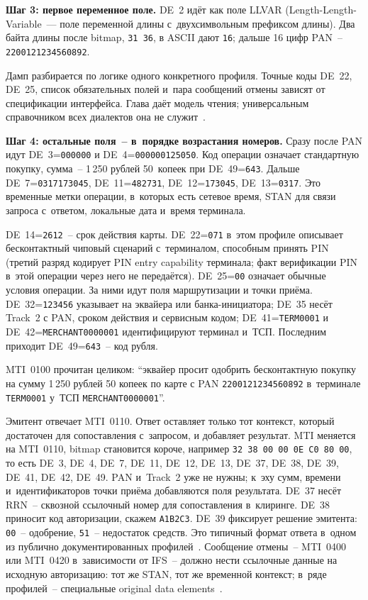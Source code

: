 \textbf{Шаг 3: первое переменное поле.} DE~2 идёт как поле LLVAR (Length-Length-Variable~--- поле переменной длины с~двухсимвольным префиксом длины). Два байта длины после bitmap, \texttt{31 36}, в ASCII дают \texttt{16}; дальше 16 цифр PAN~-- \texttt{2200121234560892}.

Дамп разбирается по логике одного конкретного профиля. Точные коды DE~22, DE~25, список обязательных полей и~пара сообщений отмены зависят от спецификации интерфейса. Глава даёт модель чтения; универсальным справочником всех диалектов она не служит~\cite{fis-iso8583-guide-2023}.

\textbf{Шаг 4: остальные поля~-- в~порядке возрастания номеров.}
Сразу после PAN идут DE~3=\texttt{000000} и DE~4=\texttt{000000125050}. Код операции означает стандартную покупку, сумма~-- 1\,250 рублей 50~копеек при DE~49=\texttt{643}.
Дальше DE~7=\texttt{0317173045}, DE~11=\texttt{482731}, DE~12=\texttt{173045}, DE~13=\texttt{0317}. Это временные метки операции, в~которых есть сетевое время, STAN для связи запроса с~ответом, локальные дата и~время терминала.

DE~14=\texttt{2612}~-- срок действия карты. DE~22=\texttt{071} в~этом профиле описывает бесконтактный чиповый сценарий с~терминалом, способным принять PIN (третий разряд кодирует PIN entry capability терминала; факт верификации PIN в~этой операции через него не передаётся). DE~25=\texttt{00} означает обычные условия операции.
За ними идут поля маршрутизации и точки приёма. DE~32=\texttt{123456} указывает на эквайера или банка-инициатора; DE~35 несёт Track~2 с PAN, сроком действия и сервисным кодом; DE~41=\texttt{TERM0001} и DE~42=\texttt{MERCHANT0000001} идентифицируют терминал и~ТСП. Последним приходит DE~49=\texttt{643}~-- код рубля.

MTI~0100 прочитан целиком: \enquote{эквайер просит одобрить бесконтактную покупку на сумму 1\,250 рублей 50 копеек по карте с PAN \texttt{2200121234560892} в~терминале \texttt{TERM0001} у~ТСП \texttt{MERCHANT0000001}}.

Эмитент отвечает MTI~0110. Ответ оставляет только тот контекст, который достаточен для сопоставления с~запросом, и добавляет результат.
MTI меняется на MTI~0110, bitmap становится короче, например \texttt{32 38 00 00 0E C0 80 00}, то есть DE~3, DE~4, DE~7, DE~11, DE~12, DE~13, DE~37, DE~38, DE~39, DE~41, DE~42, DE~49. PAN и~Track~2 уже не нужны; к~эху сумм, времени и~идентификаторов точки приёма добавляются поля результата.
DE~37 несёт RRN~-- сквозной ссылочный номер для сопоставления в~клиринге. DE~38 приносит код авторизации, скажем \texttt{A1B2C3}. DE~39 фиксирует решение эмитента: \texttt{00}~-- одобрение, \texttt{51}~-- недостаток средств. Это типичный формат ответа в~одном из публично документированных профилей~\cite{fis-iso8583-guide-2023}.
Сообщение отмены~-- MTI~0400 или MTI~0420 в~зависимости от IFS~-- должно нести ссылочные данные на исходную авторизацию: тот же STAN, тот же временной контекст; в~ряде профилей~-- специальные original data elements~\cite{fis-iso8583-guide-2023}.

